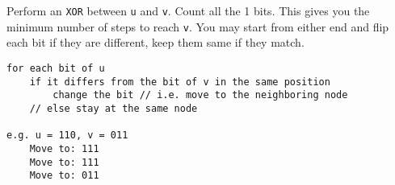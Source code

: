 \documentclass{article}
\begin{document}
\begin{enumerate}
Perform an \texttt{XOR} between \texttt{u} and \texttt{v}. Count all the 1
bits. This gives you the minimum number of steps to reach \texttt{v}. You may
start from either end and flip each bit if they are different, keep them same if
they match. 

\begin{lstlisting}
for each bit of u
    if it differs from the bit of v in the same position 
        change the bit // i.e. move to the neighboring node
    // else stay at the same node
	
e.g. u = 110, v = 011 
	Move to: 111
	Move to: 111 
	Move to: 011
\end{lstlisting}

\end{enumerate} 
\end{document}

